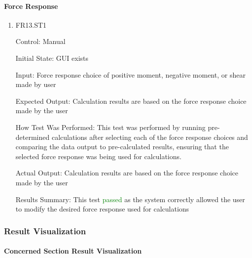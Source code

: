 \documentclass[12pt, titlepage]{article}
\begin{document}
\paragraph{Force Response}

\begin{enumerate}

\item{FR13.ST1\\}

Control: Manual
					
Initial State: GUI exists
					
Input: Force response choice of positive moment, negative moment, or shear made by user
					
Expected Output: Calculation results are based on the force response choice made by the user

How Test Was Performed: This test was performed by running pre-determined calculations after selecting each of the force response choices and comparing the data output to pre-calculated results, ensuring that the selected force response was being used for calculations.
					
Actual Output: Calculation results are based on the force response choice made by the user

Results Summary: This test \textcolor{green} {passed} as the system correctly allowed the user to modify the desired force response used for calculations
				
\end{enumerate}

\subsubsection{Result Visualization}

\paragraph{Concerned Section Result Visualization}
\end{document}
